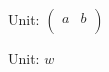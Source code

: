 \documentclass{ctexart}
\begin{document}
Unit: $ \begin{pmatrix}a&b\\\end{pmatrix}$

Unit: $ w$
\end{document}

